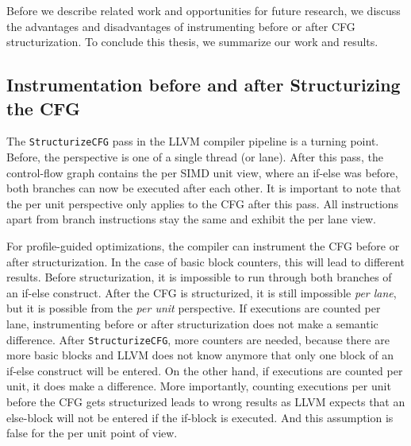 \clearpage
{}
\label{sec:discussion}
Before we describe related work and opportunities for future research, we discuss the advantages and disadvantages of instrumenting before or after CFG structurization.
To conclude this thesis, we summarize our work and results.

\subsection{Instrumentation before and after Structurizing the CFG}
\label{sub:discussion_structurize}
The \texttt{StructurizeCFG} pass in the LLVM compiler pipeline is a turning point. Before, the perspective is one of a single thread (or lane).
After this pass, the control-flow graph contains the per SIMD unit view, where an if-else was before, both branches can now be executed after each other.
It is important to note that the per unit perspective only applies to the CFG after this pass. All instructions apart from branch instructions stay the same and exhibit the per lane view.

For profile-guided optimizations, the compiler can instrument the CFG before or after structurization. In the case of basic block counters, this will lead to different results.
Before structurization, it is impossible to run through both branches of an if-else construct.
After the CFG is structurized, it is still impossible \emph{per lane}, but it is possible from the \emph{per unit} perspective.
If executions are counted per lane, instrumenting before or after structurization does not make a semantic difference.
After \texttt{StructurizeCFG}, more counters are needed, because there are more basic blocks and LLVM does not know anymore that only one block of an if-else construct will be entered.
On the other hand, if executions are counted per unit, it does make a difference. More importantly, counting executions per unit before the CFG gets structurized leads to wrong results as LLVM expects that an else-block will not be entered if the if-block is executed. And this assumption is false for the per unit point of view.

